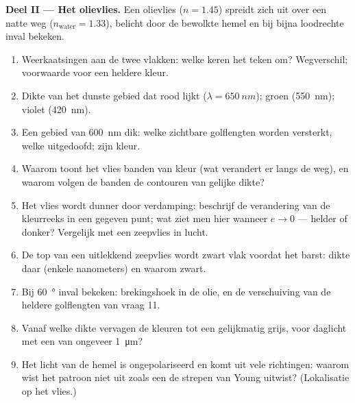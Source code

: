 \begin{problem}
\medskip
\noindent\textbf{Deel II --- Het olievlies.}
Een olievlies ($n = 1.45$) spreidt zich uit over een natte weg
($n_{\text{water}} = 1.33$),
belicht door de bewolkte hemel en bij bijna loodrechte inval bekeken.
\begin{enumerate}[resume]
  \item Weerkaatsingen aan de twee vlakken: welke keren het teken om? Weg\-verschil;
        voorwaarde voor een heldere kleur.
  \item Dikte van het dunste gebied dat rood lijkt
        ($\lambda =
        \qty{650}{nm}$); groen (\qty{550}{nm}); violet
        (\qty{420}{nm}).
  \item Een gebied van \qty{600}{nm} dik: welke zichtbare golflengten worden
        versterkt, welke uitgedoofd; zijn kleur.
  \item Waarom toont het vlies banden van kleur (wat verandert er langs de
        weg), en waarom volgen de banden de contouren van gelijke dikte?
  \item Het vlies wordt dunner door verdamping: beschrijf de verandering van de
        kleurreeks in een gegeven punt; wat ziet men hier wanneer $e \to 0$
        --- helder of donker? Vergelijk met een zeepvlies in lucht.
  \item De top van een uitlekkend zeepvlies wordt zwart vlak voordat het
        barst: dikte daar (enkele nanometers) en waarom zwart.
  \item Bij \qty{60}{\degree} inval bekeken: brekingshoek in de olie,
        en de verschuiving van de heldere golflengten van vraag 11.
  \item Vanaf welke dikte vervagen de kleuren tot een gelijkmatig
        grijs, voor daglicht met een  van ongeveer
        \qty{1}{\micro m}?
  \item Het licht van de hemel is ongepolariseerd en komt uit vele
        richtingen: waarom wist het patroon niet uit zoals een  de strepen van Young uitwist? (Lokalisatie op het vlies.)
\end{enumerate}


\end{problem}
